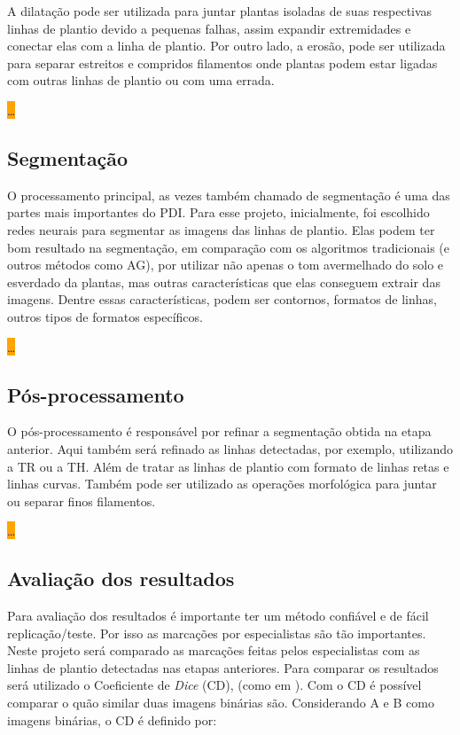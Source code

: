 \documentclass[12pt, a4paper, english, brazil]{article}
\newcommand{\dotsBlue}{\colorbox{orange}{\textcolor{blue}{\dots}}}
\begin{document}
A dilatação pode ser utilizada para juntar plantas isoladas de suas respectivas linhas de plantio devido a pequenas falhas, assim expandir extremidades e conectar elas com a linha de plantio. Por outro lado, a erosão, pode ser utilizada para separar estreitos e compridos filamentos onde plantas podem estar ligadas com outras linhas de plantio ou com uma errada.

\dotsBlue

\subsection{Segmentação}

O processamento principal, as vezes também chamado de segmentação é uma das partes mais importantes do PDI. Para esse projeto, inicialmente, foi escolhido redes neurais para segmentar as imagens das linhas de plantio. Elas podem ter bom resultado na segmentação, em comparação com os algoritmos tradicionais (e outros métodos como AG), por utilizar não apenas o tom avermelhado do solo e esverdado da plantas, mas outras características que elas conseguem extrair das imagens. Dentre essas características, podem ser contornos, formatos de linhas, outros tipos de formatos específicos. 

\dotsBlue

\subsection{Pós-processamento}

O pós-processamento é responsável por refinar a segmentação obtida na etapa anterior. Aqui também será refinado as linhas detectadas, por exemplo, utilizando a TR ou a TH. Além de tratar as linhas de plantio com formato de linhas retas e linhas curvas. Também pode ser utilizado as operações morfológica para juntar ou separar finos filamentos.

\dotsBlue

\subsection{Avaliação dos resultados}

Para avaliação dos resultados é importante ter um método confiável e de fácil replicação/teste. Por isso as marcações por especialistas são tão importantes. Neste projeto será comparado as marcações feitas pelos especialistas com as linhas de plantio detectadas nas etapas anteriores. Para comparar os resultados será utilizado o Coeficiente de \textit{Dice} (CD), (como em ). Com o CD é possível comparar o quão similar duas imagens binárias são. Considerando A e B como imagens binárias, o CD é definido por:
\end{document}
